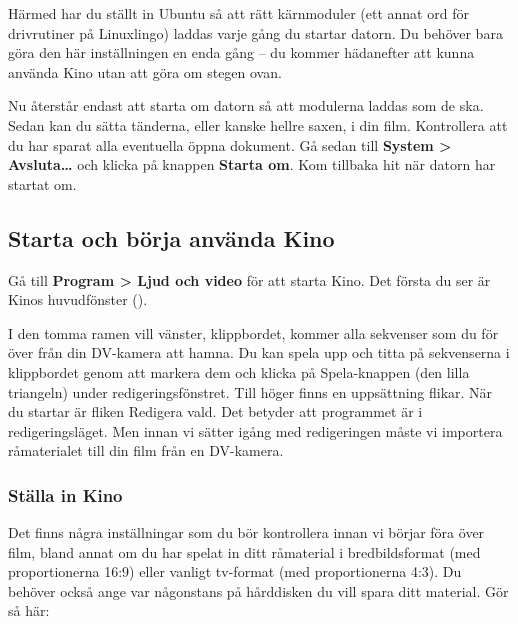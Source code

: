 \documentclass[a4paper,final]{memoir} %
\begin{document}
Härmed har du ställt in Ubuntu så att rätt kärnmoduler (ett annat ord för drivrutiner på Linuxlingo) laddas varje gång du startar datorn. Du behöver bara göra den här inställningen en enda gång -- du kommer hädanefter att kunna använda Kino utan att göra om stegen ovan. 

Nu återstår endast att starta om datorn så att modulerna laddas som de ska. Sedan kan du sätta tänderna, eller kanske hellre saxen, i din film. Kontrollera att du har sparat alla eventuella öppna dokument. Gå sedan till \textbf{System \textgreater{} Avsluta\ldots{}} och klicka på knappen \textbf{Starta om}. Kom tillbaka hit när datorn har startat om.


\subsection{Starta och börja använda Kino}

Gå till \textbf{Program \textgreater{} Ljud och video} för att starta Kino. Det första du ser är Kinos huvudfönster ().


I den tomma ramen vill vänster, klippbordet, kommer alla sekvenser som du för över från din DV-kamera att hamna. Du kan spela upp och titta på sekvenserna i klippbordet genom att markera dem och klicka på Spela-knappen (den lilla triangeln) under redigeringsfönstret. Till höger finns en uppsättning flikar. När du startar är fliken Redigera vald. Det betyder att programmet är i redigeringsläget. Men innan vi sätter igång med redigeringen måste vi importera råmaterialet till din film från en DV-kamera.

\subsubsection{Ställa in Kino}


Det finns några inställningar som du bör kontrollera innan vi börjar föra över film, bland annat om du har spelat in ditt råmaterial i bredbildsformat (med proportionerna 16:9) eller vanligt tv-format (med proportionerna 4:3). Du behöver också ange var någonstans på hårddisken du vill spara ditt material. Gör så här:
\end{document}
